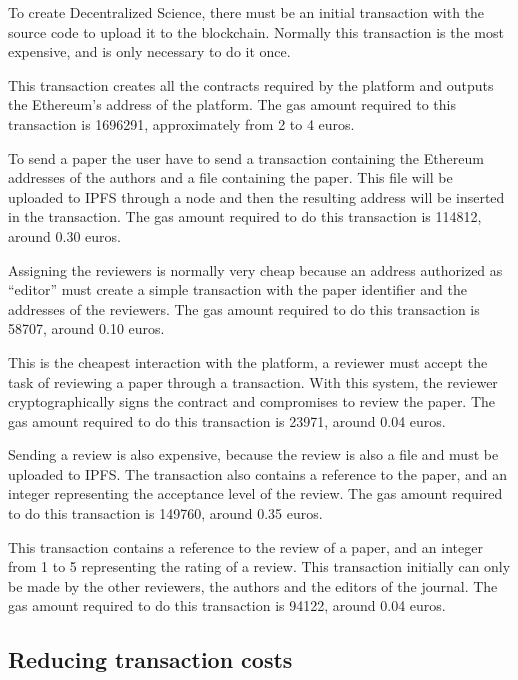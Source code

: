 \begin{itemize}
   To create Decentralized Science, there must be an
  initial transaction with the source code to upload it to the blockchain.
  Normally this transaction is the most expensive, and is only necessary to do
  it once.

  This transaction creates all the contracts required by the platform and
  outputs the Ethereum's address of the platform. The gas amount required to
  this transaction is 1696291, approximately from 2 to 4 euros.

   To send a paper the user have to send a transaction
  containing the Ethereum addresses of the authors and a file containing the
  paper. This file will be uploaded to IPFS through a node and then the
  resulting address will be inserted in the transaction. The gas amount required
  to do this transaction is 114812, around 0.30 euros.

   Assigning the reviewers is normally very cheap
  because an address authorized as ``editor'' must create a simple transaction
  with the paper identifier and the addresses of the reviewers. The gas amount
  required to do this transaction is 58707, around 0.10 euros.

   This is the cheapest interaction with the platform, a
  reviewer must accept the task of reviewing a paper through a transaction. With
  this system, the reviewer cryptographically signs the contract and compromises
  to review the paper. The gas amount required to do this transaction is 23971,
  around 0.04 euros.

   Sending a review is also expensive, because the review is
  also a file and must be uploaded to IPFS. The transaction also contains a
  reference to the paper, and an integer representing the acceptance level of
  the review. The gas amount required to do this transaction is 149760, around
  0.35 euros.

   This transaction contains a reference to the review of a
  paper, and an integer from 1 to 5 representing the rating of a review. This
  transaction initially can only be made by the other reviewers, the authors and
  the editors of the journal. The gas amount required to do this transaction is
  94122, around 0.04 euros.

\end{itemize}

\subsection{Reducing transaction costs}
\label{sec:reduc-trans-costs}

